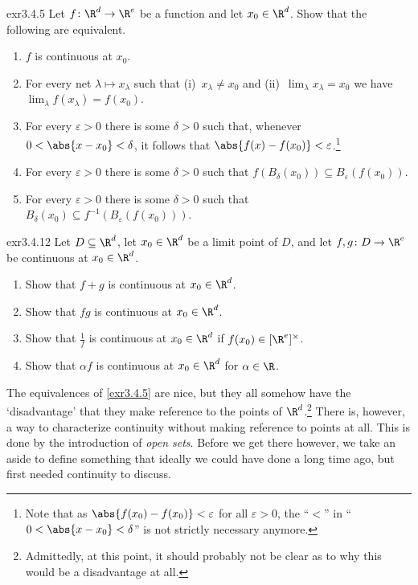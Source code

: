 \begin{exr}{}{exr3.4.5}
Let $f\colon \R ^d\rightarrow \R ^e$ be a function and let $x_0\in \R ^d$.  Show that the following are equivalent.
\begin{enumerate}
\item \label{enm3.4.5.i}$f$ is continuous at $x_0$.
\item \label{enm3.4.5.ii}For every net $\lambda \mapsto x_\lambda$ such that (i)~$x_\lambda \neq x_0$ and (ii)~$\lim _\lambda x_\lambda =x_0$ we have $\lim _\lambda f(x_\lambda )=f(x_0)$.
\item \label{enm3.4.5.iii}For every $\varepsilon >0$ there is some $\delta >0$ such that, whenever $0<\abs{x-x_0}<\delta$, it follows that $\abs{f(x)-f(x_0)}<\varepsilon$.\footnote{Note that as $\abs{f(x_0)-f(x_0)}<\varepsilon$ for all $\varepsilon >0$, the ``$<$'' in ``$0<\abs{x-x_0}<\delta$'' is not strictly necessary anymore.}
\item \label{enm3.4.5.iv}For every $\varepsilon >0$ there is some $\delta >0$ such that $f(B_\delta (x_0))\subseteq B_\varepsilon (f(x_0))$.
\item \label{enm3.4.5.v}For every $\varepsilon >0$ there is some $\delta >0$ such that $B_\delta (x_0)\subseteq f^{-1}(B_\varepsilon (f(x_0)))$.
\end{enumerate}
\end{exr}
\begin{exr}{}{exr3.4.12}
Let $D\subseteq \R ^d$, let $x_0\in \R ^d$ be a limit point of $D$, and let $f,g\colon D\rightarrow \R ^e$ be continuous at $x_0\in \R ^d$.
\begin{enumerate}
\item Show that $f+g$ is continuous at $x_0\in \R^d$.
\item Show that $fg$ is continuous at $x_0\in \R ^d$. 
\item Show that $\frac{1}{f}$ is continuous at $x_0\in \R ^d$ if $f(x_0)\in [\R ^e]^{\times}$.
\item Show that $\alpha f$ is continuous at $x_0\in \R ^d$ for $\alpha \in \R$.
\end{enumerate}
\end{exr}
The equivalences of \cref{exr3.4.5} are nice, but they all somehow have the `disadvantage' that they make reference to the points of $\R ^d$.\footnote{Admittedly, at this point, it should probably not be clear as to why this would be a disadvantage at all.}  There is, however, a way to characterize continuity without making reference to points at all.  This is done by the introduction of \emph{open sets}.  Before we get there however, we take an aside to define something that ideally we could have done a long time ago, but first needed continuity to discuss.

